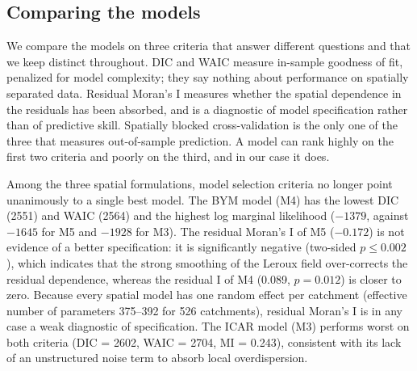 \documentclass[journal abbreviation, manuscript]{copernicus}
\newcommand{\hl}[1]{#1}
\newcommand{\hlE}[1]{#1}
\begin{document}
\subsection{\hlE{Comparing the models}}\label{subsec51}

\hlE{We compare the models on three criteria that answer different questions and that we keep distinct throughout. DIC and WAIC measure in-sample goodness of fit, penalized for model complexity; they say nothing about performance on spatially separated data. Residual Moran's I measures whether the spatial dependence in the residuals has been absorbed, and is a diagnostic of model specification rather than of predictive skill. Spatially blocked cross-validation is the only one of the three that measures out-of-sample prediction. A model can rank highly on the first two criteria and poorly on the third, and in our case it does.}

\hl{Among the three spatial formulations, model selection criteria no longer point unanimously to a single best model. 
} \hlE{The BYM model (M4) has the lowest DIC (2551) and WAIC (2564) and the highest log marginal likelihood ($-1379$, against $-1645$ for M5 and $-1928$ for M3). The residual Moran's I of M5 ($-0.172$) is not evidence of a better specification: it is significantly negative (two-sided $p \leq 0.002$), which indicates that the strong smoothing of the Leroux field over-corrects the residual dependence, whereas the residual I of M4 (0.089, $p = 0.012$) is closer to zero. Because every spatial model has one random effect per catchment (effective number of parameters 375--392 for 526 catchments), residual Moran's I is in any case a weak diagnostic of specification.} \hl{The ICAR model (M3) performs worst on both criteria (DIC = 2602, WAIC = 2704, MI = 0.243), consistent with its lack of an unstructured noise term to absorb local overdispersion.}
\end{document}
